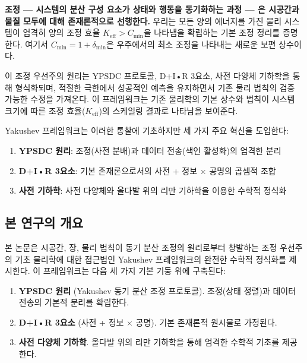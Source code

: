 \documentclass[11pt,a4paper]{article}
\begin{document}
	\textbf{조정 — 시스템의 분산 구성 요소가 상태와 행동을 동기화하는 과정 — 은 시공간과 물질 모두에 대해 존재론적으로 선행한다.} 우리는 모든 양의 에너지를 가진 물리 시스템이 엄격히 양의 조정 효율 $K_{\mathrm{eff}} > C_{\min}$을 나타냄을 확립하는 기본 조정 정리를 증명한다. 여기서 $C_{\min} = 1 + \delta_{\min}$은 우주에서의 최소 조정을 나타내는 새로운 보편 상수이다.
	
	이 조정 우선주의 원리는 YPSDC 프로토콜, D+I•R 3요소, 사전 다양체 기하학을 통해 형식화되며, 적절한 극한에서 성공적인 예측을 유지하면서 기존 물리 법칙의 검증 가능한 수정을 가져온다. 이 프레임워크는 기존 물리학의 기본 상수와 법칙이 시스템 크기에 따른 조정 효율($K_{\mathrm{eff}}$)의 스케일링 결과로 나타남을 보여준다.
	
	Yakushev 프레임워크는 이러한 통찰에 기초하지만 세 가지 주요 혁신을 도입한다:
	\begin{enumerate}
		\item \textbf{YPSDC 원리}: 조정(사전 분배)과 데이터 전송(색인 활성화)의 엄격한 분리
		\item \textbf{D+I•R 3요소}: 기본 존재론으로서의 사전 + 정보 × 공명의 곱셈적 조합
		\item \textbf{사전 기하학}: 사전 다양체와 올다발 위의 리만 기하학을 이용한 수학적 정식화
	\end{enumerate}
	
	\subsection{본 연구의 개요}
	본 논문은 시공간, 장, 물리 법칙이 동기 분산 조정의 원리로부터 창발하는 조정 우선주의 기초 물리학에 대한 접근법인 Yakushev 프레임워크의 완전한 수학적 정식화를 제시한다. 이 프레임워크는 다음 세 가지 기본 기둥 위에 구축된다:
	\begin{enumerate}
		\item \textbf{YPSDC 원리} (Yakushev 동기 분산 조정 프로토콜). 조정(상태 정렬)과 데이터 전송의 기본적 분리를 확립한다.
		\item \textbf{D+I•R 3요소} (사전 + 정보 × 공명). 기본 존재론적 원시물로 가정된다.
		\item \textbf{사전 다양체 기하학}. 올다발 위의 리만 기하학을 통해 엄격한 수학적 기초를 제공한다.
	\end{enumerate}
	
\end{document}
